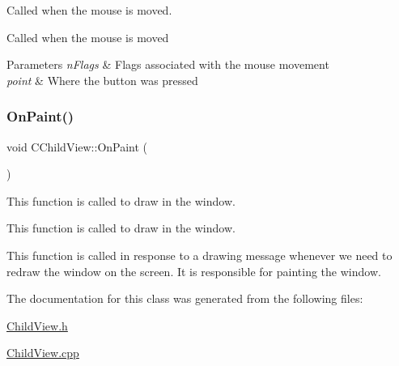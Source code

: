 Called when the mouse is moved. 

Called when the mouse is moved 
\begin{DoxyParams}{Parameters}
{\em n\+Flags} & Flags associated with the mouse movement \\
\hline
{\em point} & Where the button was pressed \\
\hline
\end{DoxyParams}
\mbox{\label{class_c_child_view_a8ea6d42631a4f9f446923ff864b239ab}} 
\subsubsection{\texorpdfstring{On\+Paint()}{OnPaint()}}
{\footnotesize\ttfamily void C\+Child\+View\+::\+On\+Paint (\begin{DoxyParamCaption}{ }\end{DoxyParamCaption})\hspace{0.3cm}{\ttfamily [protected]}}



This function is called to draw in the window. 

This function is called to draw in the window.

This function is called in response to a drawing message whenever we need to redraw the window on the screen. It is responsible for painting the window. 

The documentation for this class was generated from the following files\+:\begin{DoxyCompactItemize}
\item 
\hyperlink{_child_view_8h}{Child\+View.\+h}\item 
\hyperlink{_child_view_8cpp}{Child\+View.\+cpp}\end{DoxyCompactItemize}
